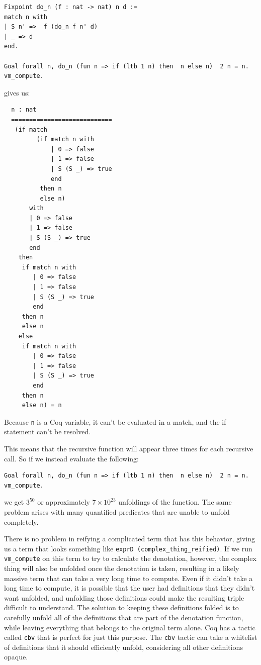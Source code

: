 \documentclass{puthesis}
\begin{document}
\begin{lstlisting}
Fixpoint do_n (f : nat -> nat) n d :=
match n with
| S n' =>  f (do_n f n' d)
| _ => d
end.

Goal forall n, do_n (fun n => if (ltb 1 n) then  n else n)  2 n = n.
vm_compute.
\end{lstlisting}

gives us:

\begin{lstlisting}
  n : nat
  ============================
   (if match
         (if match n with
             | 0 => false
             | 1 => false
             | S (S _) => true
             end
          then n
          else n)
       with
       | 0 => false
       | 1 => false
       | S (S _) => true
       end
    then
     if match n with
        | 0 => false
        | 1 => false
        | S (S _) => true
        end
     then n
     else n
    else
     if match n with
        | 0 => false
        | 1 => false
        | S (S _) => true
        end
     then n
     else n) = n
\end{lstlisting}

Because \lstinline|n| is a Coq variable, it can't be evaluated in a
match, and the if statement can't be resolved.

This means that
the recursive function will appear three times for each recursive
call. So if we instead evaluate the following:

\begin{lstlisting}
Goal forall n, do_n (fun n => if (ltb 1 n) then  n else n)  2 n = n.
vm_compute.
\end{lstlisting}

\noindent we get  $3^{50}$ or approximately $7\times 10^{23}$ unfoldings
of the function. The same problem arises with many quantified
predicates that are unable to unfold completely. 

There is no problem in reifying a complicated term that has this behavior, giving
us a term that looks something like 
\lstinline|exprD (complex_thing_reified)|. 
If we run \lstinline|vm_compute| on this
term to try to calculate the denotation, however, the complex thing will also be
unfolded once the denotation is taken, resulting in a likely massive term
that can take a very long time to compute. Even if it didn't take a
long time to compute, it is possible that the user had definitions
that they didn't want unfolded, and unfolding those definitions could
make the resulting triple difficult to understand.
The solution to keeping these definitions folded is to
carefully unfold all of the definitions that are part of the
denotation function, while leaving everything that belongs to the
original term alone. Coq has a tactic called \lstinline|cbv| that is
perfect for just this purpose. The \lstinline|cbv| tactic can take a
whitelist of definitions that it should efficiently unfold,
considering all other definitions opaque.
\end{document}
